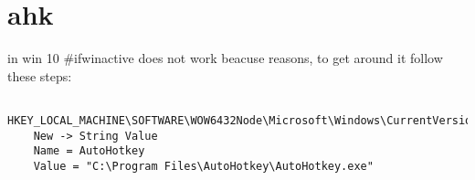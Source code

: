 \section{ahk}%
\label{sec:ahk}

in win 10 #ifwinactive does not work beacuse reasons, to get around it follow these steps:
\begin{verbatim}
	HKEY_LOCAL_MACHINE\SOFTWARE\WOW6432Node\Microsoft\Windows\CurrentVersion\Run
	New -> String Value
	Name = AutoHotkey
	Value = "C:\Program Files\AutoHotkey\AutoHotkey.exe"
\end{verbatim}

